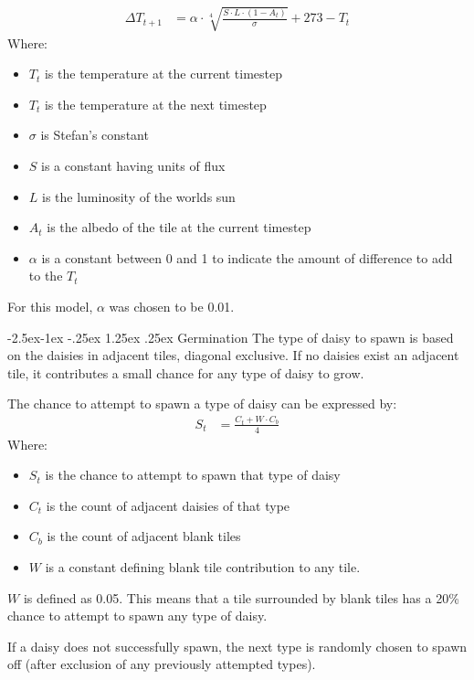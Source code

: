 \documentclass[12pt]{article}
\makeatletter
\renewcommand\paragraph{\@startsection{paragraph}{4}{\z@}%
            {-2.5ex\@plus -1ex \@minus -.25ex}%
            {1.25ex \@plus .25ex}%
            {\normalfont\normalsize\bfseries}}
\makeatother
\begin{document}
\begin{align}
  \Delta T_{t+1} &= \alpha\cdot \sqrt[4]{\frac{S\cdot L \cdot
      (1-A_t)}{\sigma}} + 273 - T_t
\end{align}
Where:
\begin{itemize}
\item $T_{t}$ is the temperature at the current timestep
\item $T_{t}$ is the temperature at the next timestep
\item $\sigma$ is Stefan's constant
\item $S$ is a constant having units of flux
\item $L$ is the luminosity of the worlds sun
\item $A_t$ is the albedo of the tile at the current timestep
\item $\alpha$ is a constant between 0 and 1 to indicate the amount of
  difference to add to the $T_t$
\end{itemize}

For this model, $\alpha$ was chosen to be 0.01.

\paragraph{Germination}
The type of daisy to spawn is based on the daisies in adjacent tiles,
diagonal exclusive. If no daisies exist an adjacent tile, it
contributes a small chance for any type of daisy to grow.

The chance to attempt to spawn a type of daisy can be expressed by:
\begin{align}
  S_t &= \frac{C_t+W\cdot C_b}{4}
\end{align}
Where:
\begin{itemize}
\item $S_t$ is the chance to attempt to spawn that type of daisy
\item $C_t$ is the count of adjacent daisies of that type
\item $C_b$ is the count of adjacent blank tiles
\item $W$ is a constant defining blank tile contribution to any tile.
\end{itemize}

$W$ is defined as 0.05. This means that a tile surrounded by blank
tiles has a 20\% chance to attempt to spawn any type of daisy.

If a daisy does not successfully spawn, the next type is randomly
chosen to spawn off (after exclusion of any previously attempted types).
\end{document}
